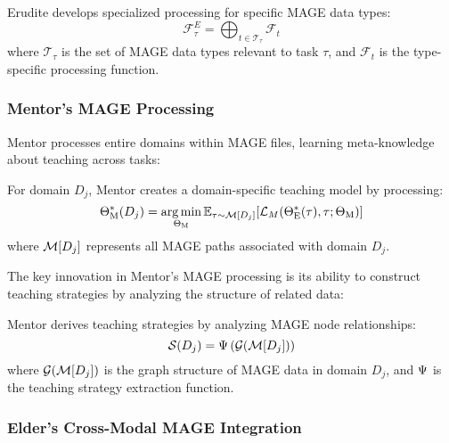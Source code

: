 \begin{proposition}
Erudite develops specialized processing for specific MAGE data types:
\begin{equation}
\mathcal{F}_{\tau}^E = \bigoplus_{t \in \mathcal{T}_{\tau}} \mathcal{F}_t
\end{equation}
where $\mathcal{T}_{\tau}$ is the set of MAGE data types relevant to task $\tau$, and $\mathcal{F}_t$ is the type-specific processing function.
\end{proposition}

\subsubsection{Mentor's MAGE Processing}

Mentor processes entire domains within MAGE files, learning meta-knowledge about teaching across tasks:

\begin{theorem}
For domain $D_j$, Mentor creates a domain-specific teaching model by processing:
\begin{equation}
\Theta_{\text{M}}^{*}(D_j) = \mathop{\mathrm{arg\,min}}_{\Theta_{\text{M}}} \mathbb{E}_{\tau \sim \mathcal{M}[D_j]} [\mathcal{L}_M(\Theta_{\text{E}}^{*}(\tau), \tau; \Theta_{\text{M}})]
\end{equation}
where $\mathcal{M}[D_j]$ represents all MAGE paths associated with domain $D_j$.
\end{theorem}

The key innovation in Mentor's MAGE processing is its ability to construct teaching strategies by analyzing the structure of related data:

\begin{proposition}
Mentor derives teaching strategies by analyzing MAGE node relationships:
\begin{equation}
\mathcal{S}(D_j) = \Psi\left(\mathcal{G}(\mathcal{M}[D_j])\right)
\end{equation}
where $\mathcal{G}(\mathcal{M}[D_j])$ is the graph structure of MAGE data in domain $D_j$, and $\Psi$ is the teaching strategy extraction function.
\end{proposition}

\subsubsection{Elder's Cross-Modal MAGE Integration}

